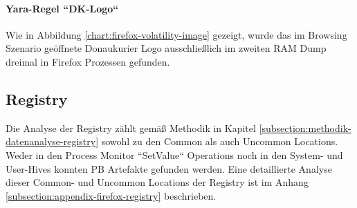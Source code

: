 \paragraph*{Yara-Regel ``DK-Logo``}
Wie in Abbildung \ref{chart:firefox-volatility-image} gezeigt, wurde das im Browsing Szenario geöffnete Donaukurier Logo ausschließlich im zweiten RAM Dump dreimal in Firefox Prozessen gefunden.
\begin{table}[h!]
	\label{chart:firefox-volatility-image}
\end{table}




\subsection*{Registry}
\label{subsection:ergebnisse-firefox-registry}
Die Analyse der Registry zählt gemäß Methodik in Kapitel \ref{subsection:methodik-datenanalyse-registry} sowohl zu den Common als auch Uncommon Locations. Weder in den Process Monitor ``SetValue`` Operations noch in den System- und User-Hives konnten PB Artefakte gefunden werden. Eine detaillierte Analyse dieser Common- und Uncommon Locations der Registry ist im Anhang \ref{subsection:appendix-firefox-registry} beschrieben.


